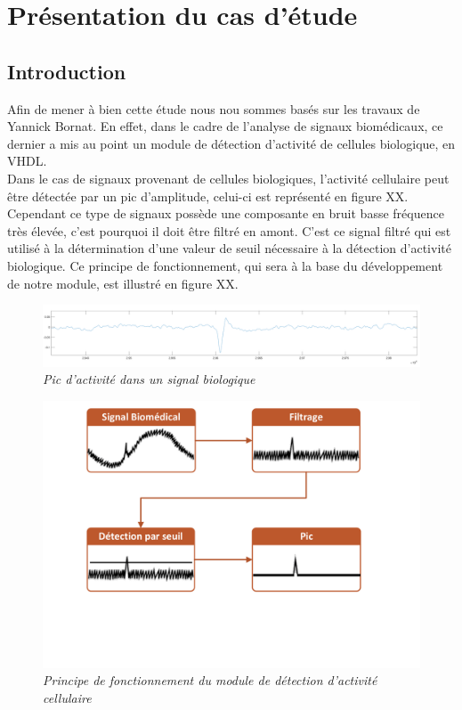 \documentclass[a4paper,12pt]{article}
\begin{document}
\newpage
\section{Présentation du cas d'étude}
\subsection{Introduction}
Afin de mener à bien cette étude nous nou sommes basés sur les travaux de Yannick Bornat. En effet, dans le cadre de l'analyse de signaux biomédicaux, ce dernier a mis au point un module de détection d'activité de cellules biologique, en VHDL.\\

Dans le cas de signaux provenant de cellules biologiques, l'activité cellulaire peut être détectée par un pic d'amplitude, celui-ci est représenté en figure XX. Cependant ce type de signaux possède une composante en bruit basse fréquence très élevée, c'est pourquoi il doit être filtré en amont. C'est ce signal filtré qui est utilisé à la détermination d'une valeur de seuil nécessaire à la détection d'activité biologique. Ce principe de fonctionnement, qui sera à la base du développement de notre module, est illustré en figure XX.\\

\begin{figure}[H]
\centering
\includegraphics[scale=0.18, keepaspectratio]{toto3.png}
\caption{\textit{Pic d'activité dans un signal biologique}}
\end{figure}

\begin{figure}[H]
\centering
\includegraphics[scale=0.5, keepaspectratio]{Dessin1.pdf}
\caption{\textit{Principe de fonctionnement du module de détection d'activité cellulaire}}
\end{figure}
\newpage
\end{document}
